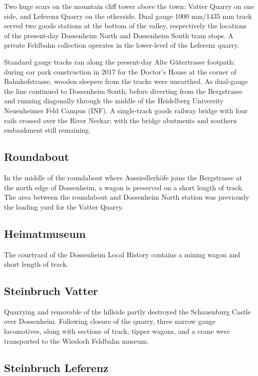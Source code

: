 \documentclass[a4paper]{report}
\begin{document}
Two huge scars on the mountain cliff tower above the town: Vatter
Quarry on one side, and Leferenz Quarry on the otherside.  Dual gauge
1000 mm/1435 mm track served two goods stations at the bottom of the
valley, respectively the locations of the present-day Dossenheim North
and Dossenheim South tram stops.  A private Feldbahn collection
operates in the lower-level of the Leferenz quarry.

Standard gauge tracks ran along the present-day Alte Gütertrasse
footpath: during car park construction in 2017 for the Doctor's House
at the corner of Bahnhofstrasse, wooden sleepers from the tracks were
unearthed.  As dual-gauge the line continued to Dossenheim South,
before diverting from the Bergstrasse and running diagonally through
the middle of the Heidelberg University Neuenheimer Feld Campus (INF).
A single-track goods railway bridge with four rails crossed over the
River Neckar; with the bridge abutments and southern embankment still remaining.

\subsection{Roundabout}

In the middle of the roundabout where Aussiedlerhöfe joins the
Bergstrasse at the north edge of Dossenheim, a wagon is preserved on a
short length of track.  The area between the roundabout and Dossenheim
North station was previously the loading yard for the Vatter Quarry.

\subsection{Heimatmuseum}

The courtyard of the Dossenheim Local History contains a mining wagon and short length of track.

\subsection{Steinbruch Vatter}

Quarrying and removable of the hillside partly destroyed the
Schauenburg Castle over Dossenheim.  Following closure of the quarry, three narrow
gauge locomotives, along with sections of track, tipper wagons, and a
crane were transported to the Wiesloch Feldbahn museum.

\subsection{Steinbruch Leferenz}
\end{document}
